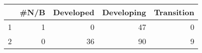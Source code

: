 \begin{table}[ht]
\centering
\begin{tabular}{rrrrr}
  \hline
 & \#N/B & Developed & Developing & Transition \\ 
  \hline
1 &   1 &   0 &  47 &   0 \\ 
  2 &   0 &  36 &  90 &   9 \\ 
   \hline
\end{tabular}
\end{table}
